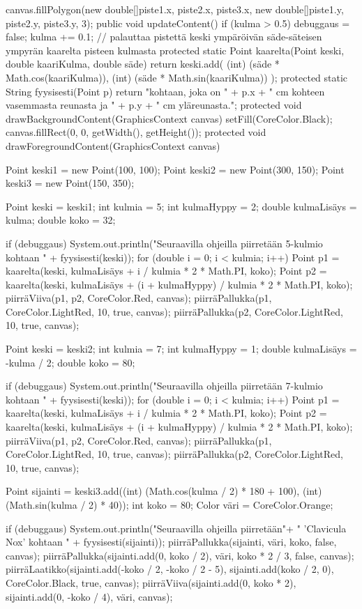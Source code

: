 \begin{javacode}
{    canvas.fillPolygon(new double[]{piste1.x, piste2.x, piste3.x}, new double[]{piste1.y,
        piste2.y, piste3.y}, 3);
  }
  public void updateContent() {
    if (kulma > 0.5) debuggaus = false;
    kulma += 0.1;
  }
  // palauttaa pistettä keski ympäröivän säde-säteisen ympyrän kaarelta pisteen kulmasta
  protected static Point kaarelta(Point keski, double kaariKulma, double säde) {
    return keski.add(
        (int) (säde * Math.cos(kaariKulma)),
        (int) (säde * Math.sin(kaariKulma))
    );
  }
  protected static String fyysisesti(Point p) {
    return "kohtaan, joka on " + p.x + " cm kohteen vasemmasta reunasta ja " + p.y +
        " cm yläreunasta.";
  }
  protected void drawBackgroundContent(GraphicsContext canvas) {
    setFill(CoreColor.Black);
    canvas.fillRect(0, 0, getWidth(), getHeight());
  }
  protected void drawForegroundContent(GraphicsContext canvas) {
    Point keski1 = new Point(100, 100);
    Point keski2 = new Point(300, 150);
    Point keski3 = new Point(150, 350);

    {
      Point keski = keski1;
      int kulmia = 5;
      int kulmaHyppy = 2;
      double kulmaLisäys = kulma;
      double koko = 32;

      if (debuggaus) System.out.println("Seuraavilla ohjeilla piirretään 5-kulmio kohtaan "
          + fyysisesti(keski));
      for (double i = 0; i < kulmia; i++) {
        Point p1 = kaarelta(keski, kulmaLisäys + i / kulmia * 2 * Math.PI, koko);
        Point p2 = kaarelta(keski, kulmaLisäys + (i + kulmaHyppy) / kulmia * 2 * Math.PI,
            koko);
        piirräViiva(p1, p2, CoreColor.Red, canvas);
        piirräPallukka(p1, CoreColor.LightRed, 10, true, canvas);
        piirräPallukka(p2, CoreColor.LightRed, 10, true, canvas);
      }
    }
    {
      Point keski = keski2;
      int kulmia = 7;
      int kulmaHyppy = 1;
      double kulmaLisäys = -kulma / 2;
      double koko = 80;

      if (debuggaus) System.out.println("Seuraavilla ohjeilla piirretään 7-kulmio kohtaan "
          + fyysisesti(keski));
      for (double i = 0; i < kulmia; i++) {
        Point p1 = kaarelta(keski, kulmaLisäys + i / kulmia * 2 * Math.PI, koko);
        Point p2 = kaarelta(keski, kulmaLisäys + (i + kulmaHyppy) / kulmia * 2 * Math.PI,
            koko);
        piirräViiva(p1, p2, CoreColor.Red, canvas);
        piirräPallukka(p1, CoreColor.LightRed, 10, true, canvas);
        piirräPallukka(p2, CoreColor.LightRed, 10, true, canvas);
      }
    }
    {
      Point sijainti = keski3.add((int) (Math.cos(kulma / 2) * 180 + 100), 
          (int) (Math.sin(kulma / 2) * 40));
      int koko = 80;
      Color väri = CoreColor.Orange;

      if (debuggaus) System.out.println("Seuraavilla ohjeilla piirretään"+
          " 'Clavicula Nox' kohtaan " + fyysisesti(sijainti));
      piirräPallukka(sijainti, väri, koko, false, canvas);
      piirräPallukka(sijainti.add(0, koko / 2), väri, koko * 2 / 3, false, canvas);
      piirräLaatikko(sijainti.add(-koko / 2, -koko / 2 - 5), sijainti.add(koko / 2, 0),
          CoreColor.Black, true, canvas);
      piirräViiva(sijainti.add(0, koko * 2), sijainti.add(0, -koko / 4), väri, canvas);
    }
  }
\end{javacode}

